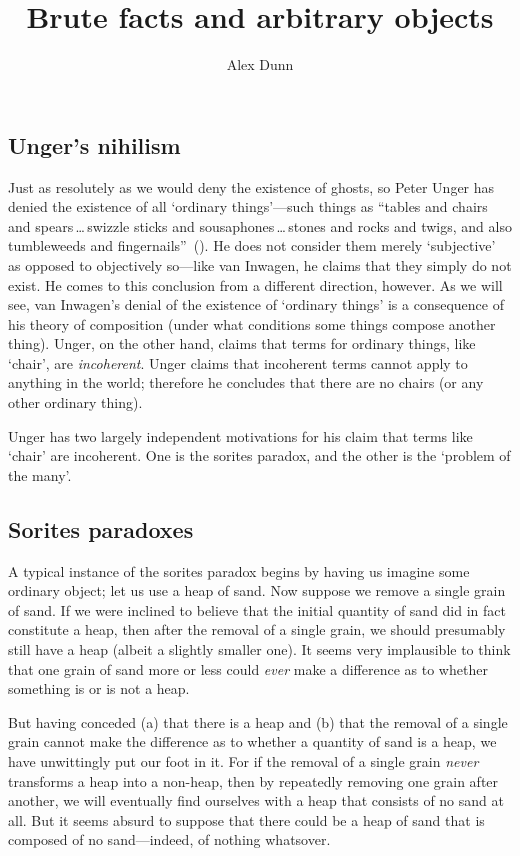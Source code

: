 \documentclass[11pt]{standalone} \newif\ifstandlone \standalonetrue
\title{Brute facts and arbitrary objects}
\author{Alex Dunn}
\begin{document}
\ifstandalone
\maketitle
\begin{spacing}{1.5}
\fi

\section{Unger's nihilism}
\label{unger}
Just as resolutely as we would deny the existence of ghosts, so Peter
Unger has denied the existence of all `ordinary things'---such things
as ``tables and chairs and spears\,\ldots\,swizzle sticks and
sousaphones\,\ldots\,stones and rocks and twigs, and also tumbleweeds
and fingernails''~(\citeyear[117]{unger1979}).  He does not consider
them merely `subjective' as opposed to objectively so---like van
Inwagen, he claims that they simply do not exist.  He comes to this
conclusion from a different direction, however.  As we will see, van
Inwagen's denial of the existence of `ordinary things' is a
consequence of his theory of composition (under what conditions some
things compose another thing).  Unger, on the other hand, claims that
terms for ordinary things, like `chair', are {\em incoherent}.  Unger
claims that incoherent terms cannot apply to anything in the world;
therefore he concludes that there are no chairs (or any other ordinary
thing).

Unger has two largely independent motivations for his claim that terms
like `chair' are incoherent.  One is the sorites paradox, and the
other is the `problem of the many'.

\subsection{Sorites paradoxes}
A typical instance of the sorites paradox begins by having us imagine
some ordinary object; let us use a heap of sand.  Now suppose we
remove a single grain of sand.  If we were inclined to believe that
the initial quantity of sand did in fact constitute a heap, then after
the removal of a single grain, we should presumably still have a heap
(albeit a slightly smaller one).  It seems very implausible to think
that one grain of sand more or less could {\em ever} make a difference
as to whether something is or is not a heap.

But having conceded (a) that there is a heap and (b) that the removal
of a single grain cannot make the difference as to whether a quantity
of sand is a heap, we have unwittingly put our foot in it.  For if the
removal of a single grain {\em never} transforms a heap into a
non-heap, then by repeatedly removing one grain after another, we will
eventually find ourselves with a heap that consists of no sand at
all.  But it seems absurd to suppose that there could be a heap of
sand that is composed of no sand---indeed, of nothing whatsover.


\end{spacing}
\end{document}
